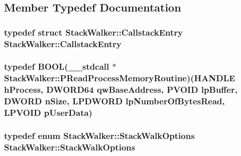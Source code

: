 \subsection{Member Typedef Documentation}
\hypertarget{class_stack_walker_ad0ad9c321961aad36f54779a8ca4ec12}{
\subsubsection[{Callstack\-Entry}]{\setlength{\rightskip}{0pt plus 5cm}typedef struct {\bf Stack\-Walker\-::\-Callstack\-Entry}  {\bf Stack\-Walker\-::\-Callstack\-Entry}\hspace{0.3cm}{\ttfamily [protected]}}}\label{class_stack_walker_ad0ad9c321961aad36f54779a8ca4ec12}
\hypertarget{class_stack_walker_a61956985807c0d6c582304c78c6dc85c}{
\subsubsection[{P\-Read\-Process\-Memory\-Routine}]{\setlength{\rightskip}{0pt plus 5cm}typedef B\-O\-O\-L(\-\_\-\-\_\-stdcall $\ast$ Stack\-Walker\-::\-P\-Read\-Process\-Memory\-Routine)(H\-A\-N\-D\-L\-E h\-Process, {\bf D\-W\-O\-R\-D64} qw\-Base\-Address, P\-V\-O\-I\-D lp\-Buffer, D\-W\-O\-R\-D n\-Size, L\-P\-D\-W\-O\-R\-D lp\-Number\-Of\-Bytes\-Read, L\-P\-V\-O\-I\-D p\-User\-Data)}}\label{class_stack_walker_a61956985807c0d6c582304c78c6dc85c}
\hypertarget{class_stack_walker_a547d82a4196c05a09fd365d83ca9cd44}{
\subsubsection[{Stack\-Walk\-Options}]{\setlength{\rightskip}{0pt plus 5cm}typedef enum {\bf Stack\-Walker\-::\-Stack\-Walk\-Options}  {\bf Stack\-Walker\-::\-Stack\-Walk\-Options}}}\label{class_stack_walker_a547d82a4196c05a09fd365d83ca9cd44}


